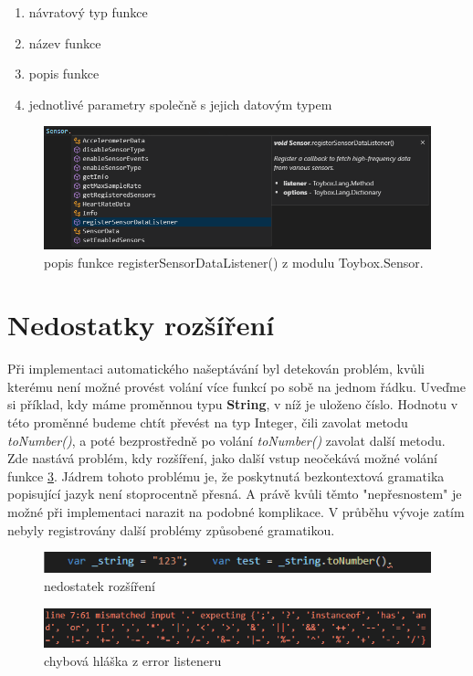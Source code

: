 \begin{enumerate}
\item návratový typ funkce
\item název funkce
\item popis funkce
\item jednotlivé parametry společně s jejich datovým typem
\end{enumerate}

\begin{figure}[tbh!]
	\centering
	\includegraphics[width=\textwidth,scale=1]{images/description}
	\caption{popis funkce registerSensorDataListener() z modulu Toybox.Sensor.}
	\label{img:description}
\end{figure}


\section{Nedostatky rozšíření}
Při implementaci automatického našeptávání byl detekován problém, kvůli kterému není možné provést volání více funkcí po sobě na jednom řádku. Uveďme si příklad, kdy máme proměnnou typu \textbf{String}, v níž je uloženo číslo. Hodnotu v této proměnné budeme chtít převést na typ Integer, čili zavolat metodu \textit{toNumber()}, a poté bezprostředně po volání \textit{toNumber()} zavolat další metodu. Zde nastává problém, kdy rozšíření, jako další vstup neočekává možné volání funkce \ref{img:autocomplete_errormessage}. Jádrem tohoto problému je, že poskytnutá bezkontextová gramatika popisující jazyk není stoprocentně přesná. A právě kvůli těmto "nepřesnostem" je možné při implementaci narazit na podobné komplikace. V průběhu vývoje zatím nebyly registrovány další problémy způsobené gramatikou.

\begin{figure}[tbh!]
	\centering
	\includegraphics[scale=1]{images/autocomplete_error}
	\caption{nedostatek rozšíření}
	\label{img:autocomplete_error}
\end{figure}

\begin{figure}[tbh!]
	\centering
	\includegraphics[scale=0.8]{images/autocomplete_errormessage}
	\caption{chybová hláška z error listeneru}
	\label{img:autocomplete_errormessage}
\end{figure}
\endinput